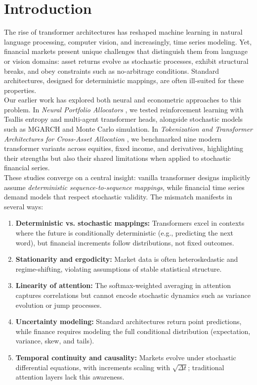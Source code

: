 \documentclass[10pt,twocolumn]{article}
\begin{document}
\clearpage
\section*{Introduction}

The rise of transformer architectures has reshaped machine learning in natural language processing, computer vision, and increasingly, time series modeling. Yet, financial markets present unique challenges that distinguish them from language or vision domains: asset returns evolve as stochastic processes, exhibit structural breaks, and obey constraints such as no-arbitrage conditions. Standard architectures, designed for deterministic mappings, are often ill-suited for these properties.\\ 

Our earlier work has explored both neural and econometric approaches to this problem. In \textit{Neural Portfolio Allocators} \cite{coulter2025neural}, we tested reinforcement learning with Tsallis entropy and multi-agent transformer heads, alongside stochastic models such as MGARCH and Monte Carlo simulation. In \textit{Tokenization and Transformer Architectures for Cross-Asset Allocation} \cite{coulter2025tokenization}, we benchmarked nine modern transformer variants across equities, fixed income, and derivatives, highlighting their strengths but also their shared limitations when applied to stochastic financial series.\\

These studies converge on a central insight: vanilla transformer designs implicitly assume \textit{deterministic sequence-to-sequence mappings}, while financial time series demand models that respect stochastic validity. The mismatch manifests in several ways:

\begin{enumerate}
    \item \textbf{Deterministic vs. stochastic mappings:} Transformers excel in contexts where the future is conditionally deterministic (e.g., predicting the next word), but financial increments follow distributions, not fixed outcomes.
    \item \textbf{Stationarity and ergodicity:} Market data is often heteroskedastic and regime-shifting, violating assumptions of stable statistical structure.
    \item \textbf{Linearity of attention:} The softmax-weighted averaging in attention captures correlations but cannot encode stochastic dynamics such as variance evolution or jump processes.
    \item \textbf{Uncertainty modeling:} Standard architectures return point predictions, while finance requires modeling the full conditional distribution (expectation, variance, skew, and tails).
    \item \textbf{Temporal continuity and causality:} Markets evolve under stochastic differential equations, with increments scaling with $\sqrt{\Delta t}$; traditional attention layers lack this awareness.
\end{enumerate}
\end{document}
